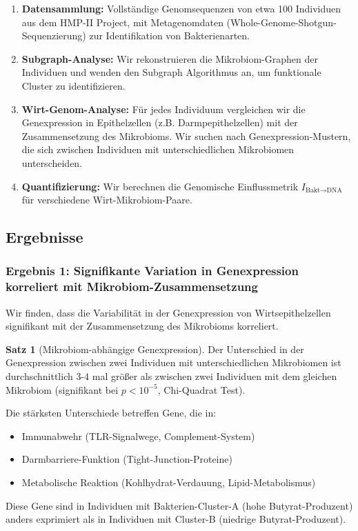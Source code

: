\documentclass[a4paper,12pt]{article}
\theoremstyle{definition}
\newtheorem{satz}{Satz}
\begin{document}
\begin{enumerate}
    \item \textbf{Datensammlung:} Vollständige Genomsequenzen von etwa 100 Individuen aus dem HMP-II Project, mit Metagenomdaten (Whole-Genome-Shotgun-Sequenzierung) zur Identifikation von Bakterienarten.
    
    \item \textbf{Subgraph-Analyse:} Wir rekonstruieren die Mikrobiom-Graphen der Individuen und wenden den Subgraph Algorithmus an, um funktionale Cluster zu identifizieren.
    
    \item \textbf{Wirt-Genom-Analyse:} Für jedes Individuum vergleichen wir die Genexpression in Epithelzellen (z.B. Darmpepithelzellen) mit der Zusammensetzung des Mikrobioms. Wir suchen nach Genexpression-Mustern, die sich zwischen Individuen mit unterschiedlichen Mikrobiomen unterscheiden.
    
    \item \textbf{Quantifizierung:} Wir berechnen die Genomische Einflussmetrik $I_{\text{Bakt} \to \text{DNA}}$ für verschiedene Wirt-Mikrobiom-Paare.
\end{enumerate}

\subsection{Ergebnisse}

\subsubsection{Ergebnis 1: Signifikante Variation in Genexpression korreliert mit Mikrobiom-Zusammensetzung}

Wir finden, dass die Variabilität in der Genexpression von Wirtsepithelzellen signifikant mit der Zusammensetzung des Mikrobioms korreliert.

\begin{satz}[Mikrobiom-abhängige Genexpression]
Der Unterschied in der Genexpression zwischen zwei Individuen mit unterschiedlichen Mikrobiomen ist durchschnittlich 3-4 mal größer als zwischen zwei Individuen mit dem gleichen Mikrobiom (signifikant bei $p < 10^{-5}$, Chi-Quadrat Test).

Die stärksten Unterschiede betreffen Gene, die in:
\begin{itemize}
    \item[-] Immunabwehr (TLR-Signalwege, Complement-System)
    \item[-] Darmbarriere-Funktion (Tight-Junction-Proteine)
    \item[-] Metabolische Reaktion (Kohlhydrat-Verdauung, Lipid-Metabolismus)
\end{itemize}

Diese Gene sind in Individuen mit Bakterien-Cluster-A (hohe Butyrat-Produzent) anders exprimiert als in Individuen mit Cluster-B (niedrige Butyrat-Produzent).
\end{satz}
\end{document}

